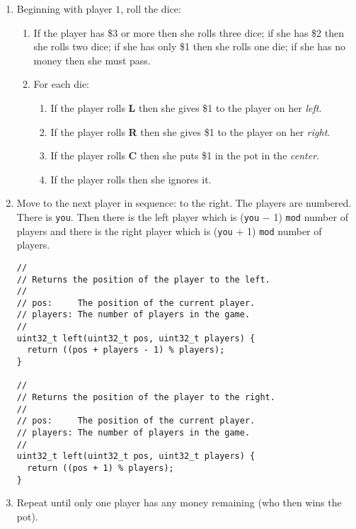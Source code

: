 \documentclass{article}
\begin{document}
\begin{enumerate}
\item
Beginning with player $1$, roll the dice:
\begin{enumerate}
\item
If the player has \$3 or more then she rolls three dice;
if she has \$2 then she rolls two dice;
if she has only \$1 then she rolls one die;
if she has no money then she must pass.

\item For each die:
\begin{enumerate}
\item If the player rolls \textbf{L} then she gives \$1 to the player on her \emph{left}.

\item If the player rolls \textbf{R} then she gives \$1 to the player on her \emph{right}.

\item If the player rolls \textbf{C} then she puts \$1 in the pot in the
    \emph{center}.

\item If the player rolls \textbf{\textbullet} then she ignores it.
\end{enumerate}

\end{enumerate}
\item Move to the next player in sequence: to the
right. The players are numbered. There is \texttt{you}. Then there
is the left player which is (\texttt{you} $-$ 1) \texttt{mod} number
of players and there is the right player which is (\texttt{you} $+$
1) \texttt{mod} number of players.
\begin{lstlisting}
//
// Returns the position of the player to the left.
//
// pos:     The position of the current player.
// players: The number of players in the game.
//
uint32_t left(uint32_t pos, uint32_t players) {
  return ((pos + players - 1) % players);
}

//
// Returns the position of the player to the right.
//
// pos:     The position of the current player.
// players: The number of players in the game.
//
uint32_t left(uint32_t pos, uint32_t players) {
  return ((pos + 1) % players);
}
\end{lstlisting}

\item Repeat until only one player has any money remaining (who then wins the pot).
\end{enumerate}
\end{document}
